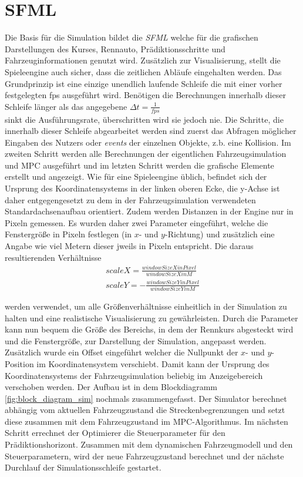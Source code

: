 \documentclass{like}
\begin{document}
\section{\acl{SFML}}
Die Basis für die Simulation bildet die \emph{ \ac{SFML}} welche für die grafischen Darstellungen des Kurses, Rennauto, Prädiktionsschritte und Fahrzeuginformationen genutzt wird. Zusätzlich zur Visualisierung, stellt die Spieleengine auch sicher, dass die zeitlichen Abläufe eingehalten werden. Das Grundprinzip ist eine einzige unendlich laufende Schleife die mit einer vorher festgelegten \ac{fps} ausgeführt wird. Benötigen die Berechnungen innerhalb dieser Schleife länger als das angegebene
$\Delta t = \frac{1}{fps}$ \\
sinkt die Ausführungsrate, überschritten wird sie jedoch nie. Die Schritte, die innerhalb dieser Schleife abgearbeitet werden sind zuerst das Abfragen möglicher Eingaben des Nutzers oder \emph{events} der einzelnen Objekte, z.b. eine Kollision. Im zweiten Schritt werden alle Berechnungen der eigentlichen Fahrzeugsimulation und \ac{MPC} ausgeführt und im letzten Schritt werden die grafische Elemente erstellt und angezeigt. Wie für eine Spieleengine üblich, befindet sich der Ursprung des Koordinatensystems in der linken oberen Ecke, die y-Achse ist daher entgegengesetzt zu dem in der Fahrzeugsimulation verwendeten Standardachsenaufbau orientiert. Zudem werden Distanzen in der Engine nur in Pixeln gemessen. Es wurden daher zwei Parameter eingeführt, welche die Fenstergröße in Pixeln festlegen (in \(x\)- und  \(y\)-Richtung)
und zusätzlich eine Angabe wie viel Metern dieser jweils in Pixeln entspricht. Die daraus resultierenden Verhältnisse \\
\begin{eqnarray}
	scaleX = \frac{windowSizeXinPixel}{windowSizeXinM} \\
	scaleY = - \frac{windowSizeYinPixel}{windowSizeYinM} 
\end{eqnarray}

werden verwendet, um alle Größenverhältnisse einheitlich in der Simulation zu halten und eine realistische Visualisierung zu gewährleisten. Durch die Parameter kann nun bequem die Größe des Bereichs, in dem der Rennkurs abgesteckt wird und die Fenstergröße, zur Darstellung der Simulation, angepasst werden. Zusätzlich wurde ein Offset eingeführt welcher die Nullpunkt der \(x\)- und \(y\)- Position im Koordinatensystem verschiebt. Damit kann der Ursprung des Koordinatensystems der Fahrzeugsimulation beliebig im Anzeigebereich verschoben werden. 
Der Aufbau ist in dem Blockdiagramm \ref{fig:block_diagram_sim} nochmals zusammengefasst. Der Simulator berechnet abhängig vom aktuellen Fahrzeugzustand die Streckenbegrenzungen und setzt diese zusammen mit dem Fahrzeugzustand im \ac{MPC}-Algorithmus. Im nächsten Schritt errechnet der Optimierer die Steuerparameter für den Prädiktionshorizont. Zusammen mit dem dynamischen Fahrzeugmodell und den Steuerparametern, wird der neue Fahrzeugzustand berechnet und der nächste Durchlauf der Simulationsschleife gestartet.
\end{document}
